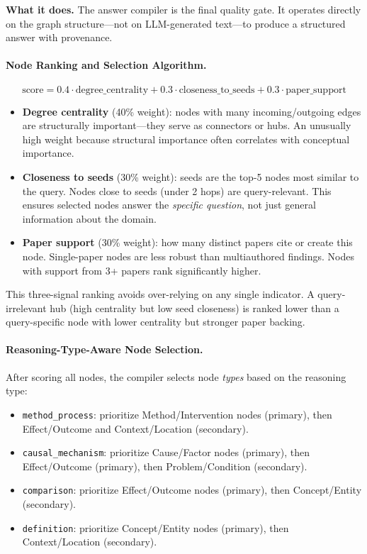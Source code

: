 \documentclass[11pt]{article}
\begin{document}
\textbf{What it does.} The answer compiler is the final quality gate. It operates directly on the graph structure---not on LLM-generated text---to produce a structured answer with provenance.

\paragraph{Node Ranking and Selection Algorithm.}
\[
\text{score} = 0.4 \cdot \text{degree\_centrality} + 0.3 \cdot \text{closeness\_to\_seeds} + 0.3 \cdot \text{paper\_support}
\]
\begin{itemize}[leftmargin=1.2em]
  \item \textbf{Degree centrality} (40\% weight): nodes with many incoming/outgoing edges are structurally important---they serve as connectors or hubs. An unusually high weight because structural importance often correlates with conceptual importance.
  
  \item \textbf{Closeness to seeds} (30\% weight): seeds are the top-5 nodes most similar to the query. Nodes close to seeds (under 2 hops) are query-relevant. This ensures selected nodes answer the \emph{specific question}, not just general information about the domain.
  
  \item \textbf{Paper support} (30\% weight): how many distinct papers cite or create this node. Single-paper nodes are less robust than multiauthored findings. Nodes with support from 3+ papers rank significantly higher.
\end{itemize}

This three-signal ranking avoids over-relying on any single indicator. A query-irrelevant hub (high centrality but low seed closeness) is ranked lower than a query-specific node with lower centrality but stronger paper backing.

\paragraph{Reasoning-Type-Aware Node Selection.} After scoring all nodes, the compiler selects node \emph{types} based on the reasoning type:
\begin{itemize}[leftmargin=1.2em]
  \item \texttt{method\_process}: prioritize Method/Intervention nodes (primary), then Effect/Outcome and Context/Location (secondary).
  \item \texttt{causal\_mechanism}: prioritize Cause/Factor nodes (primary), then Effect/Outcome (primary), then Problem/Condition (secondary).
  \item \texttt{comparison}: prioritize Effect/Outcome nodes (primary), then Concept/Entity (secondary).
  \item \texttt{definition}: prioritize Concept/Entity nodes (primary), then Context/Location (secondary).
\end{itemize}
\end{document}
